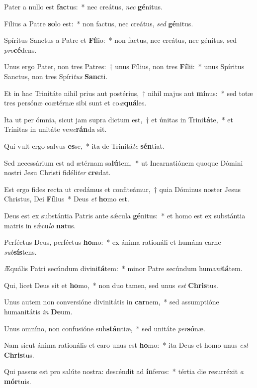 \item Pater a nullo est \textbf{fac}tus:~* nec creátus, \textit{nec} \textbf{gé}nitus.
\item Fílius a Patre \textbf{so}lo est:~* non factus, nec creátus, \textit{sed} \textbf{gé}nitus.
\item Spíritus Sanctus a Patre et \textbf{Fí}lio:~* non factus, nec creátus, nec génitus, sed \textit{pro}\textbf{cé}dens.
\item Unus ergo Pater, non tres Patres:~† unus Fílius, non tres \textbf{Fí}lii:~* unus Spíritus Sanctus, non tres Spíri\textit{tus} \textbf{Sanc}ti.
\item Et in hac Trinitáte nihil prius aut postérius,~† nihil majus aut \textbf{mi}nus:~* sed totæ tres persónæ coætérnæ sibi sunt et co\textit{æ}\textbf{quá}les.
\item Ita ut per ómnia, sicut jam supra dictum est,~† et únitas in Trini\textbf{tá}te,~* et Trínitas in unitáte ve\textit{ne}\textbf{rán}da sit.
\item Qui vult ergo salvus \textbf{es}se,~* ita de Trinitá\textit{te} \textbf{sén}tiat.
\item Sed necessárium est ad ætérnam sa\textbf{lú}tem,~* ut Incarnatiónem quoque Dómini nostri Jesu Christi fidéli\textit{ter} \textbf{cre}dat.
\item Est ergo fides recta ut credámus et confiteámur,~† quia Dóminus noster Jesus Christus, Dei \textbf{Fí}lius~* Deus \textit{et} \textbf{ho}mo est.
\item Deus est ex substántia Patris ante sǽcula \textbf{gé}nitus:~* et homo est ex substántia matris in sǽcu\textit{lo} \textbf{na}tus.
\item Perféctus Deus, perféctus \textbf{ho}mo:~* ex ánima rationáli et humána carne \textit{sub}\textbf{sís}tens.
\item Æquális Patri secúndum divini\textbf{tá}tem:~* minor Patre secúndum huma\textit{ni}\textbf{tá}tem.
\item Qui, licet Deus sit et \textbf{ho}mo,~* non duo tamen, sed unus \textit{est} \textbf{Chris}tus.
\item Unus autem non conversióne divinitátis in \textbf{car}nem,~* sed assumptióne humanitátis \textit{in} \textbf{De}um.
\item Unus omníno, non confusióne sub\textbf{stán}tiæ,~* sed unitáte \textit{per}\textbf{só}næ.
\item Nam sicut ánima rationális et caro unus est \textbf{ho}mo:~* ita Deus et homo unus \textit{est} \textbf{Chris}tus.
\item Qui passus est pro salúte nostra: descéndit ad \textbf{ín}feros:~* tértia die resurréxit \textit{a} \textbf{mór}tuis.
